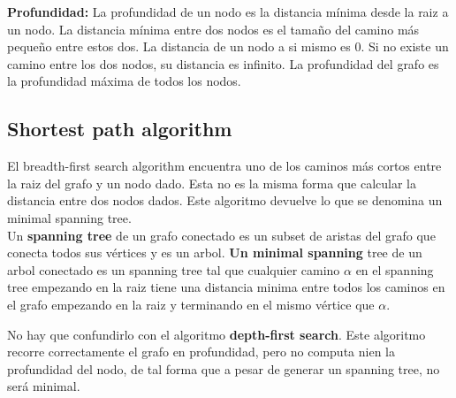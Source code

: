 \documentclass[11pt]{article}
\theoremstyle{plain}
\begin{document}
            \textbf{Profundidad:} La profundidad de un nodo es la distancia mínima desde la raiz a un nodo. La distancia mínima entre dos nodos es el tamaño del camino más pequeño entre estos dos. La distancia de un nodo a si mismo es 0. Si no existe un camino entre los dos nodos, su distancia es infinito. La profundidad del grafo es la profundidad máxima de todos los nodos.
        \subsection{Shortest path algorithm} %
        \label{sub:shortest_path_algorithm}
            El breadth-first search algorithm encuentra uno de los caminos más cortos entre la raiz del grafo y un nodo dado. Esta no es la misma forma que calcular la distancia entre dos nodos dados. Este algoritmo devuelve lo que se denomina un minimal spanning tree.\\

            Un \textbf{spanning tree} de un grafo conectado es un subset de aristas del grafo que conecta todos sus vértices y es un arbol. \textbf{Un minimal spanning} tree de un arbol conectado es un spanning tree tal que cualquier camino $\alpha$ en el spanning tree empezando en la raiz tiene una distancia minima entre todos los caminos en el grafo empezando en la raiz y terminando en el mismo vértice que $\alpha$.

            No hay que confundirlo con el algoritmo \textbf{depth-first search}. Este algoritmo recorre correctamente el grafo en profundidad, pero no computa nien la profundidad del nodo, de tal forma que a pesar de generar un spanning tree, no será minimal.
\end{document}
